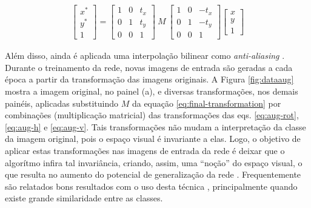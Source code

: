 \begin{align} \label{eq:final-transformation}
  \begin{bmatrix}
    x^* \\
    y^* \\
    1
  \end{bmatrix}
  =
  \begin{bmatrix}
    1 & 0 & t_x \\
    0 & 1 & t_y \\
    0 & 0 & 1
  \end{bmatrix}
  \ M\
  \begin{bmatrix}
    1 & 0 & -t_x \\
    0 & 1 & -t_y \\
    0 & 0 & 1
  \end{bmatrix}
  \begin{bmatrix}
    x \\
    y \\
    1
  \end{bmatrix}
\end{align}

Além disso, ainda é aplicada uma interpolação bilinear como \emph{anti-aliasing} \cite{aliasing,bilinear}. Durante o treinamento da rede, novas imagens de entrada são geradas a cada época a partir da transformação das imagens originais. A Figura \ref{fig:dataaug} mostra a imagem original, no painel (a), e diversas transformações, nos demais painéis, aplicadas substituindo $M$ da equação \eqref{eq:final-transformation} por combinações (multiplicação matricial) das transformações das eqs. \eqref{eq:aug-rot}, \eqref{eq:aug-h} e \eqref{eq:aug-v}. Tais transformações não mudam a interpretação da classe da imagem original, pois o espaço visual é invariante a elas. Logo, o objetivo de aplicar estas transformações nas imagens de entrada da rede é deixar que o algorítmo infira tal invariância, criando, assim, uma ``noção'' do espaço visual, o que resulta no aumento do potencial de generalização da rede \cite{Simard2003,CholletBook}. Frequentemente são relatados bons resultados com o uso desta técnica \cite{EfficientNetEx01,EfficientNetEx02,CNNEx04}, principalmente quando existe grande similaridade entre as classes.







